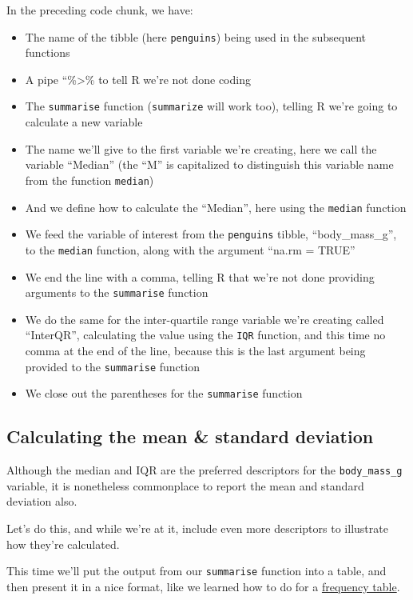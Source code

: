 \documentclass[
]{book}
\providecommand{\tightlist}{%
  \setlength{\itemsep}{0pt}\setlength{\parskip}{0pt}}
\begin{document}
In the preceding code chunk, we have:

\begin{itemize}
\tightlist
\item
  The name of the tibble (here \texttt{penguins}) being used in the subsequent functions
\item
  A pipe ``\%\textgreater\% to tell R we're not done coding
\item
  The \texttt{summarise} function (\texttt{summarize} will work too), telling R we're going to calculate a new variable
\item
  The name we'll give to the first variable we're creating, here we call the variable ``Median'' (the ``M'' is capitalized to distinguish this variable name from the function \texttt{median})
\item
  And we define how to calculate the ``Median'', here using the \texttt{median} function
\item
  We feed the variable of interest from the \texttt{penguins} tibble, ``body\_mass\_g'', to the \texttt{median} function, along with the argument ``na.rm = TRUE''
\item
  We end the line with a comma, telling R that we're not done providing arguments to the \texttt{summarise} function
\item
  We do the same for the inter-quartile range variable we're creating called ``InterQR'', calculating the value using the \texttt{IQR} function, and this time no comma at the end of the line, because this is the last argument being provided to the \texttt{summarise} function
\item
  We close out the parentheses for the \texttt{summarise} function
\end{itemize}

\subsection{Calculating the mean \& standard deviation}\label{mean_sd}

Although the median and IQR are the preferred descriptors for the \texttt{body\_mass\_g} variable, it is nonetheless commonplace to report the mean and standard deviation also.

Let's do this, and while we're at it, include even more descriptors to illustrate how they're calculated.

This time we'll put the output from our \texttt{summarise} function into a table, and then present it in a nice format, like we learned how to do for a \hyperref[vis_cat_freq_table]{frequency table}.
\end{document}
